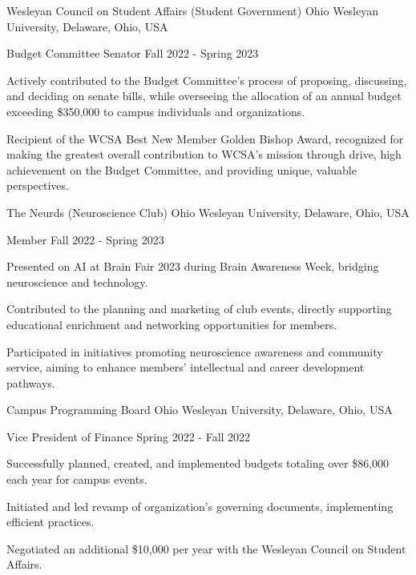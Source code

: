 \documentclass[10pt, letterpaper]{article}
\begin{document}
\begin{leadershipentry}
  {Wesleyan Council on Student Affairs (Student Government)} %
  {Ohio Wesleyan University, Delaware, Ohio, USA} %
  \begin{positionentry}
    {Budget Committee Senator} %
    {Fall 2022 - Spring 2023} %
    \item Actively contributed to the Budget Committee's process of proposing, discussing, and deciding on senate bills, while overseeing the allocation of an annual budget exceeding \$350,000 to campus individuals and organizations.
    \item Recipient of the WCSA Best New Member Golden Bishop Award, recognized for making the greatest overall contribution to WCSA's mission through drive, high achievement on the Budget Committee, and providing unique, valuable perspectives.
  \end{positionentry}
\end{leadershipentry}

\begin{leadershipentry}
  {The Neurds (Neuroscience Club)} %
  {Ohio Wesleyan University, Delaware, Ohio, USA} %
  \begin{positionentry}
    {Member} %
    {Fall 2022 - Spring 2023} %
    \item Presented on AI at Brain Fair 2023 during Brain Awareness Week, bridging neuroscience and technology.
    \item Contributed to the planning and marketing of club events, directly supporting educational enrichment and networking opportunities for members.
    \item Participated in initiatives promoting neuroscience awareness and community service, aiming to enhance members' intellectual and career development pathways.
  \end{positionentry}
\end{leadershipentry}

\begin{leadershipentry}
  {Campus Programming Board} %
  {Ohio Wesleyan University, Delaware, Ohio, USA} %
  \begin{positionentry}
    {Vice President of Finance} %
    {Spring 2022 - Fall 2022} %
    \item Successfully planned, created, and implemented budgets totaling over \$86,000 each year for campus events.
    \item Initiated and led revamp of organization's governing documents, implementing efficient practices.
    \item Negotiated an additional \$10,000 per year with the Wesleyan Council on Student Affairs.
  \end{positionentry}
\end{leadershipentry}
\end{document}
